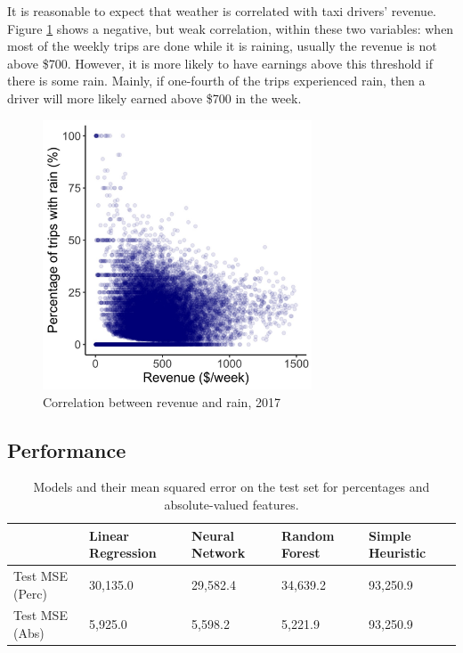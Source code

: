 \documentclass[twoside,11pt]{article}
\begin{document}
It is reasonable to expect that weather is correlated with taxi drivers' revenue. Figure \ref{fig:figure1} shows a negative, but weak correlation, within these two variables: when most of the weekly trips are done while it is raining, usually the revenue is not above \$700. However, it is more likely to have earnings above this threshold if there is some rain. Mainly, if one-fourth of the trips experienced rain, then a driver will more likely earned above \$700 in the week.

\begin{figure}[H]
  \begin{center}
    \includegraphics[height=8cm]{Plot_rainy_and_revenue.jpg}
    \caption{Correlation between revenue and rain, 2017}
    \label{fig:figure1}
  \end{center}
\end{figure}

\subsection{Performance}

\begin{table}[H]
    \centering
    \begin{tabular}{C{3cm}|C{2cm}|C{2cm}|C{2cm}|C{2cm}}
        & Linear Regression & Neural Network & Random Forest & Simple Heuristic\\
        \hline
        Test MSE (Perc) & 30,135.0 & 29,582.4 & 34,639.2 & 93,250.9\\
        Test MSE (Abs) & 5,925.0 & 5,598.2 & 5,221.9 & 93,250.9
    \end{tabular}
    \caption{Models and their mean squared error on the test set for percentages and absolute-valued features.}
    \label{tab:performance}
\end{table}
\end{document}

